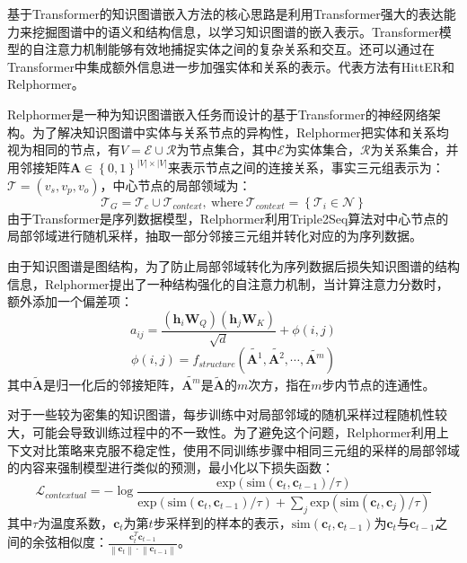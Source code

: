 基于Transformer的知识图谱嵌入方法的核心思路是利用Transformer强大的表达能力来挖掘图谱中的语义和结构信息，以学习知识图谱的嵌入表示。Transformer模型的自注意力机制能够有效地捕捉实体之间的复杂关系和交互。还可以通过在Transformer中集成额外信息进一步加强实体和关系的表示。代表方法有HittER和Relphormer。

Relphormer是一种为知识图谱嵌入任务而设计的基于Transformer的神经网络架构。为了解决知识图谱中实体与关系节点的异构性，Relphormer把实体和关系均视为相同的节点，有$ V=\mathcal{E} \cup \mathcal{R}$为节点集合，其中$\mathcal{E}$为实体集合，$\mathcal{R}$为关系集合，并用邻接矩阵$\mathbf{A} \in\left\{0,1\right\}^{\left\lvert V\right\rvert\times \left\lvert V\right\rvert} $来表示节点之间的连接关系，事实三元组表示为：$\mathcal{T} =(v_s,v_p,v_o)$，中心节点的局部领域为：
\begin{equation}
  \mathcal{T}_G = \mathcal{T}_c \cup \mathcal{T}_{context}, \ \mbox{where} \ \mathcal{T}_{context} =\left\{\mathcal{T}_i\in\mathcal{N} \right\} 
\end{equation}
由于Transformer是序列数据模型，Relphormer利用Triple2Seq算法对中心节点的局部邻域进行随机采样，抽取一部分邻接三元组并转化对应的为序列数据。

由于知识图谱是图结构，为了防止局部邻域转化为序列数据后损失知识图谱的结构信息，Relphormer提出了一种结构强化的自注意力机制，当计算注意力分数时，额外添加一个偏差项：
\begin{equation}
  a_{ij}=\frac{(\mathbf{h}_i\mathbf{W}_Q)(\mathbf{h}_j\mathbf{W}_K)}{\sqrt{d}}+\phi (i,j)
\end{equation}
\begin{equation}
  \phi (i,j)=f_{structure}(\tilde{\mathbf{A}^1},\tilde{\mathbf{A}^2},\cdots,\tilde{\mathbf{A}^m} )
\end{equation}
其中$\tilde{\mathbf{A}}$是归一化后的邻接矩阵，$\tilde{\mathbf{A}^m}$是$\tilde{\mathbf{A}}$的$m$次方，指在$m$步内节点的连通性。

对于一些较为密集的知识图谱，每步训练中对局部邻域的随机采样过程随机性较大，可能会导致训练过程中的不一致性。为了避免这个问题，Relphormer利用上下文对比策略来克服不稳定性，使用不同训练步骤中相同三元组的采样的局部邻域的内容来强制模型进行类似的预测，最小化以下损失函数：
\begin{equation}
  \mathcal{L}_{contextual} = -\log\frac{\mbox{exp}(\mbox{sim}(\boldsymbol{c}_t,\boldsymbol{c}_{t-1})/\tau )}{\mbox{exp}(\mbox{sim}(\boldsymbol{c}_t,\boldsymbol{c}_{t-1})/\tau )+\sum_j\mbox{exp}(\mbox{sim}(\boldsymbol{c}_t,\boldsymbol{c}_{j})/\tau )}
\end{equation}
其中$\tau$为温度系数，$\boldsymbol{c}_t$为第$t$步采样到的样本的表示，$\mbox{sim}(\boldsymbol{c}_t,\boldsymbol{c}_{t-1})$为$\boldsymbol{c}_t$与$\boldsymbol{c}_{t-1}$之间的余弦相似度：$\frac{\boldsymbol{c}_t^T\boldsymbol{c}_{t-1}}{\left\lVert \boldsymbol{c}_{t}\right\rVert \cdot \left\lVert \boldsymbol{c}_{t-1}\right\rVert }$。

